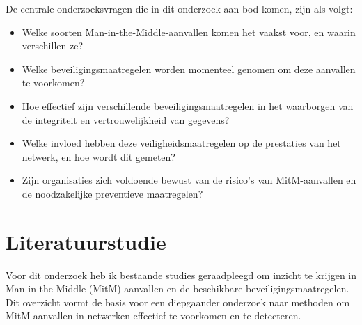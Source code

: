 De centrale onderzoeksvragen die in dit onderzoek aan bod komen, zijn als volgt:

\begin{itemize}
  \item Welke soorten Man-in-the-Middle-aanvallen komen het vaakst voor, en waarin verschillen ze?
  
  \item Welke beveiligingsmaatregelen worden momenteel genomen om deze aanvallen te voorkomen?
  
  \item Hoe effectief zijn verschillende beveiligingsmaatregelen in het waarborgen van de integriteit en vertrouwelijkheid van gegevens?
  \item Welke invloed hebben deze veiligheidsmaatregelen op de prestaties van het netwerk, en hoe wordt dit gemeten?
  
  \item Zijn organisaties zich voldoende bewust van de risico’s van MitM-aanvallen en de noodzakelijke preventieve maatregelen?
\end{itemize}


\section{Literatuurstudie}%
\label{sec:literatuurstudie}
Voor dit onderzoek heb ik bestaande studies geraadpleegd om inzicht te krijgen in Man-in-the-Middle (MitM)-aanvallen en de beschikbare beveiligingsmaatregelen. Dit overzicht vormt de basis voor een diepgaander onderzoek naar methoden om MitM-aanvallen in netwerken effectief te voorkomen en te detecteren.


